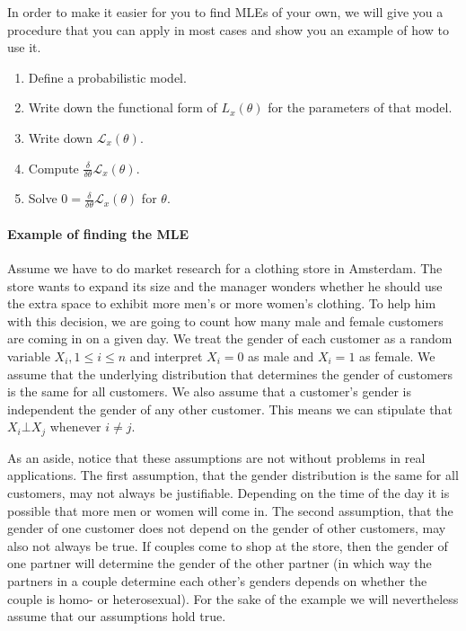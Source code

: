 In order to make it easier for you to find MLEs of your own, we will give you a procedure that you can apply in most cases and
show you an example of how to use it.
\begin{enumerate}
\item Define a probabilistic model.
\item Write down the functional form of $ L_{x}(\theta) $ for the parameters of that model.
\item Write down $ \mathcal{L}_{x}(\theta) $.
\item Compute $ \frac{\delta}{\delta \theta} \mathcal{L}_{x}(\theta) $.
\item Solve $ 0 = \frac{\delta}{\delta \theta} \mathcal{L}_{x}(\theta) $ for $ \theta $.
\end{enumerate}

\paragraph{Example of finding the MLE} Assume we have to do market research for a clothing store in Amsterdam.
The store wants to expand its size and the manager wonders whether he should use the extra space to 
exhibit more men's or more women's clothing. To help him with this decision, we are going to count 
how many male and female customers are coming in on a given day. We treat the gender of each customer
as a random variable $ X_{i}, 1 \leq i \leq n $ and interpret $ X_{i} = 0 $ as male and $ X_{i} = 1 $ as
female. We assume that the underlying distribution that determines the gender of customers
is the same for all customers. We also assume that a customer's gender is independent the gender of any
other customer. This means we can stipulate that $ X_{i} \bot X_{j} $ whenever $ i \not = j $.

As an aside, notice that these assumptions are not without problems in real applications. 
The first assumption, that the gender
distribution is the same for all customers, may not always be justifiable. Depending on the time of the day
it is possible that more men or women will come in. The second assumption, that the gender of one customer
does not depend on the gender of other customers, may also not always be true. If couples come to shop
at the store, then the gender of one partner will determine the gender of the other partner (in which
way the partners in a couple determine each other's genders depends on whether the couple is homo- or
heterosexual). For the sake of the example we will nevertheless assume that our assumptions hold true.

